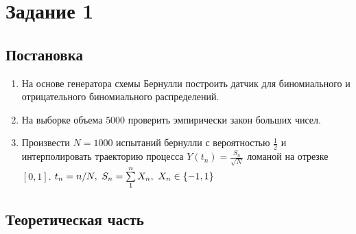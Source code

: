 \documentclass[12pt, a4paper]{article}
\begin{document}
\tableofcontents

\newpage

\section{Задание 1}
\subsection{Постановка}
\begin{enumerate}
\item На основе генератора схемы Бернулли построить датчик для биномиального и отрицательного биномиального 
распределений.
\item На выборке объема $5000$ проверить эмпирически закон больших чисел.
\item Произвести $N=1000$ испытаний бернулли с вероятностью $\frac 12$ и интерполировать траекторию процесса $Y(t_n)=\frac{S_n}{\sqrt{N}}$ ломаной на отрезке $\left[0,1\right]$. $t_n = n/N,\ \linebreak S_n = \sum\limits_1^n X_n,\ X_n\in\left\{-1,1\right\}$
\end{enumerate}
\subsection{Теоретическая часть}
\end{document}
